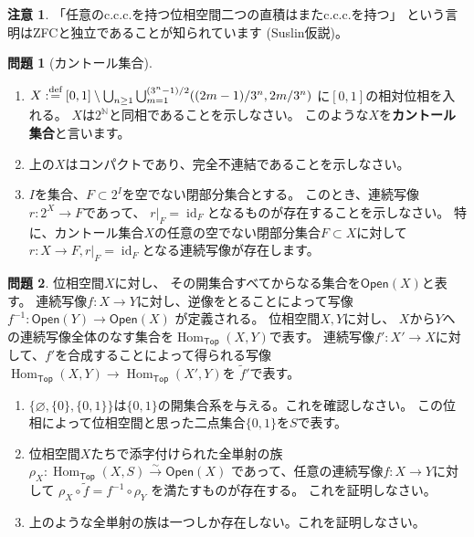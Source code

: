 \documentclass[uplatex]{jsarticle}
\theoremstyle{definition}
\newtheorem{prob}[prob]{問題}
\newtheorem*{rem*}{注意}
\DeclareMathOperator{\Hom}{Hom}
\DeclareMathOperator{\id}{\mathrm{id}}
\renewcommand{\emptyset}{\varnothing}
\newcommand{\dfn}{:\overset{\mbox{{\scriptsize def}}}{=}}
\newcommand{\N}{\mathbb{N}}
\begin{document}
\begin{rem*}
  「任意のc.c.c.を持つ位相空間二つの直積はまたc.c.c.を持つ」
  という言明はZFCと独立であることが知られています (Suslin仮説)。
\end{rem*}



\begin{prob}[カントール集合]
  \
  \begin{enumerate}
    \item
    \(X\dfn [0,1]\setminus \bigcup_{n\geq 1}\bigcup_{m=1}^{(3^n-1)/2} ((2m-1)/3^n,2m/3^n)\)
    に\([0,1]\)の相対位相を入れる。
    \(X\)は\(2^{\N}\)と同相であることを示しなさい。
    このような\(X\)を\textbf{カントール集合}と言います。
    \item
    上の\(X\)はコンパクトであり、完全不連結であることを示しなさい。
    \item
    \(I\)を集合、\(F\subset 2^I\)を空でない閉部分集合とする。
    このとき、連続写像\(r:2^X \to F\)であって、
    \(r|_F = \id_F\)となるものが存在することを示しなさい。
    特に、カントール集合\(X\)の任意の空でない閉部分集合\(F\subset X\)に対して
    \(r:X\to F, r|_F = \id_F\)となる連続写像が存在します。
  \end{enumerate}
\end{prob}




\begin{prob}
  位相空間\(X\)に対し、
  その開集合すべてからなる集合を\(\mathsf{Open}(X)\)と表す。
  連続写像\(f:X\to Y\)に対し、逆像をとることによって写像
  \(f^{-1}: \mathsf{Open}(Y) \to \mathsf{Open}(X)\)
  が定義される。
  位相空間\(X,Y\)に対し、
  \(X\)から\(Y\)への連続写像全体のなす集合を\(\Hom_{\mathsf{Top}}(X,Y)\)で表す。
  連続写像\(f':X'\to X\)に対して、\(f'\)を合成することによって得られる写像
  \(\Hom_{\mathsf{Top}}(X,Y)\to \Hom_{\mathsf{Top}}(X',Y)\)を
  \(\tilde{f}'\)で表す。
  \begin{enumerate}
    \item
    \(\{\emptyset,\{0\},\{0,1\}\}\)は\(\{0,1\}\)の開集合系を与える。これを確認しなさい。
    この位相によって位相空間と思った二点集合\(\{0,1\}\)を\(S\)で表す。
    \item
    位相空間\(X\)たちで添字付けられた全単射の族
    \(\rho_X: \Hom_{\mathsf{Top}}(X,S) \xrightarrow{\sim} \mathsf{Open}(X)\)
    であって、任意の連続写像\(f:X\to Y\)に対して
    \(\rho_X \circ \tilde{f} = f^{-1}\circ \rho_Y\)
    を満たすものが存在する。
    これを証明しなさい。
    \item
    上のような全単射の族は一つしか存在しない。これを証明しなさい。
  \end{enumerate}
\end{prob}
\end{document}
